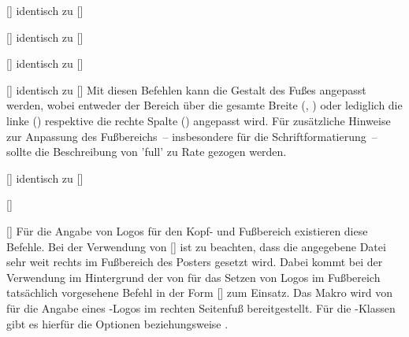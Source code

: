 \begin{Bundle*}{}
\begin{Declaration}{[]}{%
  identisch zu []
}
\begin{Declaration}{[]}{%
  identisch zu []
}
\begin{Declaration}{[]}{%
  identisch zu [\POParameter{*}]
}
\begin{Declaration}{[]}{%
  identisch zu [\PParameter{*}]
}
\printdeclarationlist%
%
Mit diesen Befehlen kann die Gestalt des Fußes angepasst werden, wobei entweder 
der Bereich über die gesamte Breite (, ) 
oder lediglich die linke () respektive die rechte Spalte 
() angepasst wird. Für zusätzliche Hinweise zur Anpassung 
des Fußbereichs~-- insbesondere für die Schriftformatierung~-- sollte die 
Beschreibung von 'full' zu Rate gezogen werden.
\end{Declaration}
\end{Declaration}
\end{Declaration}
\end{Declaration}


\begin{Declaration}{[]}{%
  identisch zu []
}
\begin{Declaration}{[]}{%
}
\begin{Declaration}{[]}{%
}
\printdeclarationlist%
%
Für die Angabe von Logos für den Kopf- und Fußbereich existieren diese Befehle. 
Bei der Verwendung von [] ist zu 
beachten, dass die angegebene Datei sehr weit rechts im Fußbereich des Posters 
gesetzt wird. Dabei kommt bei der Verwendung im Hintergrund der von \TUDScript 
für das Setzen von Logos im Fußbereich tatsächlich vorgesehene Befehl in der 
Form []
zum Einsatz. Das Makro  wird von  für 
die Angabe eines \DDC-Logos im rechten Seitenfuß bereitgestellt. Für die 
\TUDScript-Klassen gibt es hierfür die Optionen  beziehungsweise 
.
\end{Declaration}
\end{Declaration}
\end{Declaration}


\end{Bundle*}
